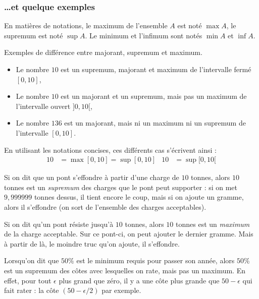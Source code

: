\subsubsection{\ldots et quelque exemples}

En matières de notations, le maximum de l'ensemble $A$ est noté $\max A$, le supremum est noté $\sup A$. Le minimum et l'infimum sont notés $\min A$ et $\inf A$.

\begin{exemple}
Exemples de différence entre majorant, supremum et maximum.
\begin{itemize}
\item Le nombre $10$ est un supremum, majorant et maximum de l'intervalle fermé $[0,10]$,
\item Le nombre $10$ est un majorant et un supremum, mais pas un maximum de l'intervalle ouvert $]0,10[$,
\item Le nombre $136$ est un majorant, mais ni un maximum ni un supremum de l'intervalle $[0,10]$.
\end{itemize}
\end{exemple}

En utilisant les notations concises, ces différents cas s'écrivent ainsi :
\begin{align*}
10&=\max[0,10]=\sup[0,10]	& 10&=\sup[0,10[
\end{align*}


\begin{exemple}
Si on dit que un pont s'effondre à partir d'une charge de $10$ tonnes, alors $10$ tonnes est un \emph{supremum} des charges que le pont peut supporter : si on met $9,999999$ tonnes dessus, il tient encore le coup, mais si on ajoute un gramme, alors il s'effondre (on sort de l'ensemble des charges acceptables).
\end{exemple}

\begin{exemple}
Si on dit qu'un pont résiste jusqu'à $10$ tonnes, alors $10$ tonnes est un \emph{maximum} de la charge acceptable. Sur ce pont-ci, on peut ajouter le dernier gramme. Mais à partir de là, le moindre truc qu'on ajoute, il s'effondre.
\end{exemple}

\begin{exemple}
Lorsqu'on dit que $50\%$ est le minimum requis pour passer son année, alors $50\%$ est un supremum des côtes avec lesquelles on rate, mais pas un maximum. En effet, pour tout $\epsilon$ plus grand que zéro, il y a une côte plus grande que $50-\epsilon$ qui fait rater : la côte $(50-\epsilon/2)$ par exemple.
\end{exemple}

